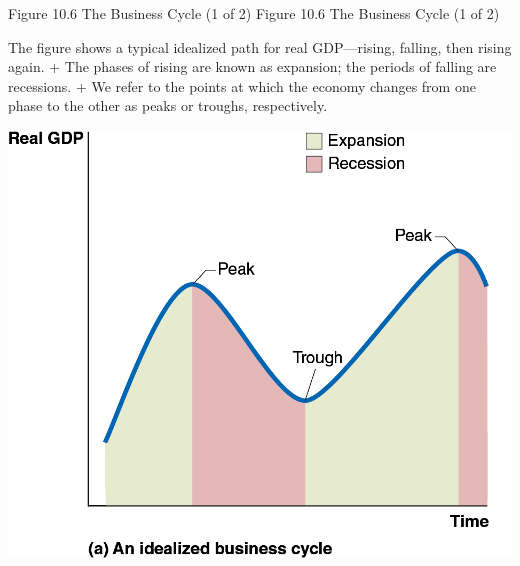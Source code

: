 \documentclass[
  12pt,
  ignorenonframetext,
]{beamer}
\begin{document}
\begin{frame}{Figure 10.6 The Business Cycle (1 of 2)}
\label{figure-10.6-the-business-cycle-1-of-2}
Figure 10.6 The Business Cycle (1 of 2)

The figure shows a typical idealized path for real GDP---rising,
falling, then rising again. + The phases of rising are known as
expansion; the periods of falling are recessions. + We refer to the
points at which the economy changes from one phase to the other as peaks
or troughs, respectively.

\includegraphics[width=\textwidth,height=0.99\textheight]{imgs3/img_slide34a.png}
\end{frame}
\end{document}
